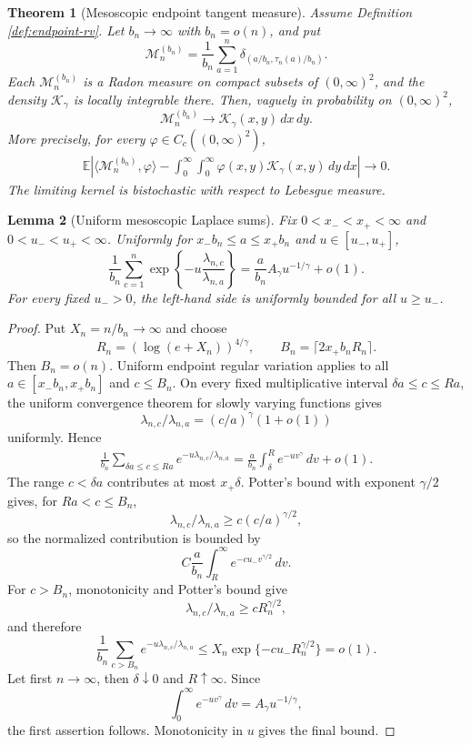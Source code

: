 \documentclass[11pt]{article}
\newtheorem{theorem}{Theorem}[section]
\newtheorem{lemma}[theorem]{Lemma}
\theoremstyle{remark}
\newcommand{\Ee}{\mathbb E}
\newcommand{\dd}{\,d}
\begin{document}
\begin{theorem}[Mesoscopic endpoint tangent measure]
\label{thm:endpoint-tangent-measure}
Assume Definition \ref{def:endpoint-rv}.  Let $b_n\to\infty$ with
$b_n=o(n)$, and put
\[
        \mathcal M_n^{(b_n)}
        =\frac1{b_n}\sum_{a=1}^n
        \delta_{(a/b_n,\tau_n(a)/b_n)}.
\]
Each \(\mathcal M_n^{(b_n)}\) is a Radon measure on compact subsets of
\((0,\infty)^2\), and the density \(\mathcal K_\gamma\) is locally
integrable there.  Then, vaguely in probability on $(0,\infty)^2$,
\[
        \mathcal M_n^{(b_n)}
        \longrightarrow
        \mathcal K_\gamma(x,y)\dd x\dd y.
\]
More precisely, for every $\varphi\in C_c((0,\infty)^2)$,
\[
\begin{aligned}
        \Ee\left|
        \langle\mathcal M_n^{(b_n)},\varphi\rangle
        -\int_0^\infty\int_0^\infty
        \varphi(x,y)\mathcal K_\gamma(x,y)\dd y\dd x
        \right|\longrightarrow0.
\end{aligned}
\]
The limiting kernel is bistochastic with respect to Lebesgue measure.
\end{theorem}

\begin{lemma}[Uniform mesoscopic Laplace sums]
\label{lem:mesoscopic-laplace-sums}
Fix $0<x_-<x_+<\infty$ and $0<u_-<u_+<\infty$.  Uniformly for
$x_-b_n\le a\le x_+b_n$ and $u\in[u_-,u_+]$,
\[
        \frac1{b_n}\sum_{c=1}^n
        \exp\left\{-u\frac{\lambda_{n,c}}{\lambda_{n,a}}\right\}
        =\frac a{b_n}A_\gamma u^{-1/\gamma}+o(1).
\]
For every fixed $u_->0$, the left-hand side is uniformly bounded for all
$u\ge u_-$.
\end{lemma}

\begin{proof}
Put $X_n=n/b_n\to\infty$ and choose
\[
        R_n=(\log(e+X_n))^{4/\gamma},
        \qquad B_n=\lceil2x_+b_nR_n\rceil.
\]
Then $B_n=o(n)$.  Uniform endpoint regular variation applies to all
$a\in[x_-b_n,x_+b_n]$ and $c\le B_n$.  On every fixed multiplicative interval
$\delta a\le c\le Ra$, the uniform convergence theorem for slowly varying
functions gives
\[
        \lambda_{n,c}/\lambda_{n,a}=(c/a)^\gamma(1+o(1))
\]
uniformly.  Hence
\[
\begin{aligned}
        \frac1{b_n}\sum_{\delta a\le c\le Ra}
        e^{-u\lambda_{n,c}/\lambda_{n,a}}
        =\frac a{b_n}\int_\delta^R e^{-uv^\gamma}\dd v+o(1).
\end{aligned}
\]
The range $c<\delta a$ contributes at most $x_+\delta$.  Potter's bound with
exponent $\gamma/2$ gives, for $Ra<c\le B_n$,
\[
        \lambda_{n,c}/\lambda_{n,a}
        \ge c(c/a)^{\gamma/2},
\]
so the normalized contribution is bounded by
\[
        C\frac a{b_n}\int_R^\infty e^{-cu_-v^{\gamma/2}}\dd v.
\]
For $c>B_n$, monotonicity and Potter's bound give
\[
        \lambda_{n,c}/\lambda_{n,a}\ge cR_n^{\gamma/2},
\]
and therefore
\[
        \frac1{b_n}\sum_{c>B_n}
        e^{-u\lambda_{n,c}/\lambda_{n,a}}
        \le X_n\exp\{-cu_-R_n^{\gamma/2}\}=o(1).
\]
Let first $n\to\infty$, then $\delta\downarrow0$ and $R\uparrow\infty$.
Since
\[
        \int_0^\infty e^{-uv^\gamma}\dd v
        =A_\gamma u^{-1/\gamma},
\]
the first assertion follows.  Monotonicity in $u$ gives the final bound.
\end{proof}
\end{document}
